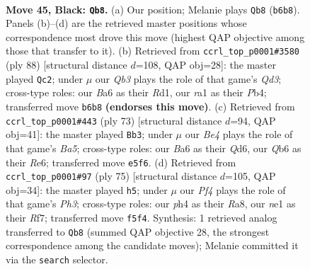 \documentclass[11pt]{article}
\begin{document}
\clearpage

\begin{figure}[p]\centering
\begin{subfigure}{0.46\textwidth}\centering
\resizebox{\linewidth}{!}{%
\newchessgame
\chessboard[
  setfen={5k2/r6p/bq2p3/p2pbpBQ/P1np3P/8/2R2P2/RN2N1K1 b - - 11 45},
  showmover=false,
  pgfstyle=straightmove, color=movearrow, markmove={b6-b8}
]}
\caption{}
\end{subfigure}\hfill
\begin{subfigure}{0.46\textwidth}\centering
\resizebox{\linewidth}{!}{%
\newchessgame
\chessboard[
  setfen={1r5k/3p1bb1/7p/1p1Nq1p1/pP2B1P1/P2QP3/5PK1/3R4 w - - 7 45},
  showmover=false,
  pgfstyle=straightmove, color=movearrow, markmove={d3-c2}
]}
\caption{}
\end{subfigure}
\\[4pt]
\begin{subfigure}{0.46\textwidth}\centering
\resizebox{\linewidth}{!}{%
\newchessgame
\chessboard[
  setfen={6k1/7p/1p1qr1p1/p1np4/b7/P1Q2P1P/5BP1/2R2B1K b - - 6 37},
  showmover=false,
  pgfstyle=straightmove, color=movearrow, markmove={a4-b3}
]}
\caption{}
\end{subfigure}\hfill
\begin{subfigure}{0.46\textwidth}\centering
\resizebox{\linewidth}{!}{%
\newchessgame
\chessboard[
  setfen={r7/q3pr2/3pNbkp/P1pP1p2/5Pn1/1P5R/4Q1P1/3RB2K b - - 10 38},
  showmover=false,
  pgfstyle=straightmove, color=movearrow, markmove={h6-h5}
]}
\caption{}
\end{subfigure}
\caption{\textbf{Move 45, Black: \texttt{Qb8}.} (a) Our position; Melanie plays \texttt{Qb8} (\texttt{b6b8}). Panels (b)--(d) are the retrieved master positions whose correspondence most drove this move (highest QAP objective among those that transfer to it). (b) Retrieved from \texttt{ccrl\_top\_p0001\#3580} (ply 88) [structural distance $d$=108, QAP obj=28]: the master played \texttt{Qc2}; under $\mu$ our \emph{Qb3} plays the role of that game's \emph{Qd3}; cross-type roles: our \emph{B}a6 as their \emph{R}d1, our \emph{r}a1 as their \emph{P}b4; transferred move \texttt{b6b8} \textbf{(endorses this move)}. (c) Retrieved from \texttt{ccrl\_top\_p0001\#443} (ply 73) [structural distance $d$=94, QAP obj=41]: the master played \texttt{Bb3}; under $\mu$ our \emph{Be4} plays the role of that game's \emph{Ba5}; cross-type roles: our \emph{B}a6 as their \emph{Q}d6, our \emph{Q}b6 as their \emph{R}e6; transferred move \texttt{e5f6}. (d) Retrieved from \texttt{ccrl\_top\_p0001\#97} (ply 75) [structural distance $d$=105, QAP obj=34]: the master played \texttt{h5}; under $\mu$ our \emph{Pf4} plays the role of that game's \emph{Ph3}; cross-type roles: our \emph{p}h4 as their \emph{R}a8, our \emph{n}e1 as their \emph{R}f7; transferred move \texttt{f5f4}. Synthesis: 1 retrieved analog transferred to \texttt{Qb8} (summed QAP objective 28, the strongest correspondence among the candidate moves); Melanie committed it via the \texttt{search} selector.}
\label{fig:thought-m89}
\end{figure}
\end{document}
